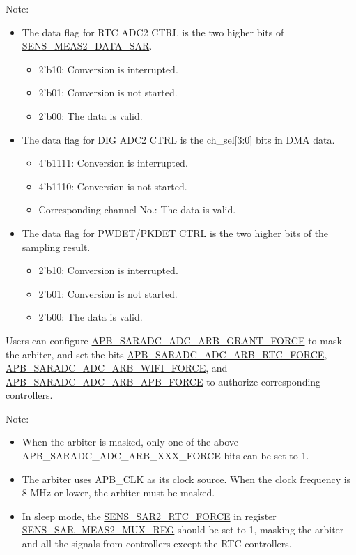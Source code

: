 \documentclass[main\_\_EN.tex]{subfiles}
\begin{document}
Note:
\begin{itemize}
    \item The data flag for RTC ADC2 CTRL is the two higher bits of \hyperref[fielddesc:SENSMEAS2DATASAR]{SENS\_MEAS2\_DATA\_SAR}.
    \begin{itemize}
        \item 2’b10: Conversion is interrupted.
        \item 2’b01: Conversion is not started.
        \item 2’b00: The data is valid.
    \end{itemize}
    \item The data flag for DIG ADC2 CTRL is the ch\_sel[3:0] bits in DMA data.
    \begin{itemize}
        \item 4’b1111: Conversion is interrupted.
        \item 4’b1110: Conversion is not started.
        \item Corresponding channel No.: The data is valid.
    \end{itemize}
    \item The data flag for PWDET/PKDET CTRL is the two higher bits of the sampling result.
    \begin{itemize}
        \item 2’b10: Conversion is interrupted.
        \item 2’b01: Conversion is not started.
        \item 2’b00: The data is valid.
    \end{itemize}
\end{itemize}

Users can configure \hyperref[fielddesc:APBSARADCADCARBGRANTFORCE]{APB\_SARADC\_ADC\_ARB\_GRANT\_FORCE} to mask the arbiter, and set the bits \hyperref[fielddesc:APBSARADCADCARBRTCFORCE]{APB\_SARADC\_ADC\_ARB\_RTC\_FORCE}, \hyperref[fielddesc:APBSARADCADCARBWIFIFORCE]{APB\_SARADC\_ADC\_ARB\_WIFI\_FORCE}, and \hyperref[fielddesc:APBSARADCADCARBAPBFORCE]{APB\_SARADC\_ADC\_ARB\_APB\_FORCE} to authorize corresponding controllers.

Note:
\begin{itemize}
    \item When the arbiter is masked, only one of the above APB\_SARADC\_ADC\_ARB\_XXX\_FORCE bits can be set to 1.
    \item The arbiter uses APB\_CLK as its clock source. When the clock frequency is 8 MHz or lower, the arbiter must be masked.
    \item In sleep mode, the \hyperref[fielddesc:SENSSAR2RTCFORCE]{SENS\_SAR2\_RTC\_FORCE} in register \hyperref[regdesc:SENSSARMEAS2MUXREG]{SENS\_SAR\_MEAS2\_MUX\_REG} should be set to 1, masking the arbiter and all the signals from controllers except the RTC controllers.
\end{itemize}
\end{document}
